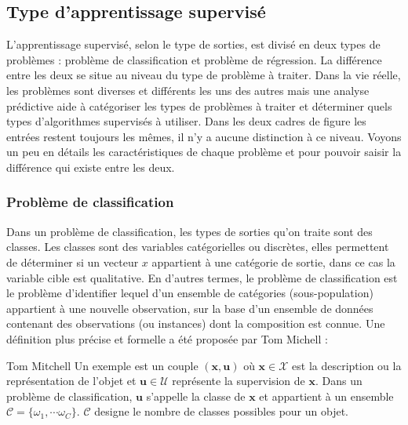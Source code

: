 \documentclass[12pt, french]{report}
\begin{document}

\subsection{Type d'apprentissage supervisé}

L'apprentissage supervisé, selon le type de sorties, est divisé en deux types de problèmes : problème de classification et problème de régression. La différence entre les deux se situe au niveau du type de problème à traiter. Dans la vie réelle, les problèmes sont diverses et différents les uns des autres mais une analyse prédictive aide à catégoriser les types de problèmes à traiter et déterminer quels types d'algorithmes supervisés à utiliser.  Dans les deux cadres de figure les entrées restent toujours les mêmes, il n'y a aucune distinction à ce niveau. Voyons un peu en détails les caractéristiques de chaque problème et pour pouvoir saisir la différence qui existe entre les deux.  

\subsubsection{Problème de classification} 
Dans un problème de classification, les types de sorties qu'on traite sont des classes. Les classes sont des variables catégorielles ou discrètes, elles permettent de déterminer si un vecteur $x$ appartient à une catégorie de sortie, dans ce cas la variable cible est qualitative. En d'autres termes, le problème de classification est le problème d'identifier lequel d'un ensemble de catégories (sous-population) appartient à une nouvelle observation, sur la base d'un ensemble de données contenant des observations (ou instances) dont la composition est connue. Une définition plus précise et formelle a été proposée par Tom Michell :

\begin{pquotation} {Tom Mitchell \cite[p.~88]{key38}}
	\guillemotleft Un exemple est un couple $(\mathbf{x,u})$ où $\mathbf{x} \in \mathcal{X}$ est la description ou la représentation de l'objet et $\mathbf{u} \in \mathcal{U}$ représente la supervision de $\mathbf{x}$. Dans un problème de classification, $\mathbf{u}$ s'appelle la classe de $\mathbf{x}$ et appartient à un ensemble $\mathcal{C} = \{\omega_1, \cdots \omega_C \}$. $\mathcal{C}$ designe le nombre de classes possibles pour un objet\guillemotright.
\end{pquotation}
\end{document}
